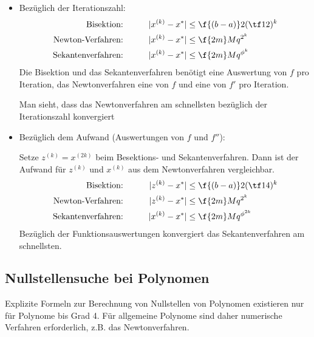 \documentclass[11pt]{scrartcl}
\begin{document}
\begin{nt*}
	\begin{itemize}
		\item
			Bezüglich der Iterationszahl:
			\begin{alignat*}{3}
				\text{Bisektion:}&\qquad& |x^{(k)} -x^*| &\le \f {(b-a)}2 (\tf 12)^k \\
				\text{Newton-Verfahren:}&\qquad& |x^{(k)} -x^*| &\le \f {2m}M q^{2^k} \\
				\text{Sekantenverfahren:}&\qquad& |x^{(k)} -x^*| &\le \f {2m}M q^{\phi^k}
			\end{alignat*}
			Die Bisektion und das Sekantenverfahren benötigt eine Auswertung von $f$ pro Iteration, das Newtonverfahren eine von $f$ und eine von $f'$ pro Iteration.

			Man sieht, dass das Newtonverfahren am schnellsten bezüglich der Iterationszahl konvergiert
		\item
			Bezüglich dem Aufwand (Auswertungen von $f$ und $f''$):

			Setze $z^{(k)} = x^{(2k)}$ beim Besektions- und Sekantenverfahren.
			Dann ist der Aufwand für $z^{(k)}$ und $x^{(k)}$ aus dem Newtonverfahren vergleichbar.
			\begin{alignat*}{3}
				\text{Bisektion:}&\qquad& |z^{(k)} -x^*| &\le \f {(b-a)}2 (\tf 14)^k \\
				\text{Newton-Verfahren:}&\qquad& |z^{(k)} -x^*| &\le \f {2m}M q^{2^k} \\
				\text{Sekantenverfahren:}&\qquad& |x^{(k)} -x^*| &\le \f {2m}M q^{\phi^{2k}} 
			\end{alignat*}
			Bezüglich der Funktionsauswertungen konvergiert das Sekantenverfahren am schnellsten.


	\end{itemize}
\end{nt*}

\subsection{Nullstellensuche bei Polynomen}

Explizite Formeln zur Berechnung von Nullstellen von Polynomen existieren nur für Polynome bis Grad 4.
Für allgemeine Polynome sind daher numerische Verfahren erforderlich, z.B. das Newtonverfahren.
\end{document}
